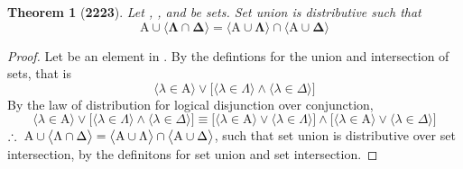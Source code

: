 \documentclass[preview]{standalone}
\newtheorem{theorem}{Theorem}
\begin{document}
\begin{theorem}[\textbf{2223}]
    Let , \bm{$\Lambda$}, and \bm{$\Delta$} be sets.
    Set union is distributive such that
    \begin{equation*}
        \bm{
            \mathrm{A} \cup \Big \langle \Lambda \cap \Delta \Big \rangle 
                =
            \Big \langle \mathrm{A} \cup \Lambda \Big \rangle
                \cap 
            \Big \langle \mathrm{A} \cup \Delta \Big \rangle
        }
    \end{equation*}
\end{theorem}
\begin{proof}
    Let \bm{$\lambda$} be an element in 
    .
    By the defintions for the union and intersection of sets, that is 
    \begin{equation*}
        \big \langle \lambda \in \mathrm{A} \big \rangle
            \lor
        \Big[
            \big \langle \lambda \in \Lambda \big \rangle
                \land
            \big \langle \lambda \in \Delta \big \rangle
        \Big]
    \end{equation*}
    By the law of distribution for logical disjunction over conjunction,
    \begin{equation*}
        \big \langle \lambda \in \mathrm{A} \big \rangle
            \lor
        \Big[
            \big \langle \lambda \in \Lambda \big \rangle
                \land
            \big \langle \lambda \in \Delta \big \rangle
        \Big] 
            \equiv
        \Big[
            \big \langle \lambda \in \mathrm{A} \big \rangle
                \lor
            \big \langle \lambda \in \Lambda \big \rangle
        \Big]
            \land
        \Big[
            \big \langle \lambda \in \mathrm{A} \big \rangle
                \lor
            \big \langle \lambda \in \Delta \big \rangle
        \Big]
    \end{equation*}
    $\therefore \text{\space} \relax{
    \mathrm{A} \cup \big \langle \Lambda \cap \Delta \big \rangle 
        = 
    \big \langle \mathrm{A} \cup \Lambda \big \rangle
        \cap 
    \big \langle \mathrm{A} \cup \Delta \big \rangle
    }$, 
    such that set union is distributive over set intersection,
    by the definitons for set union and set intersection.
\end{proof}
\end{document}
